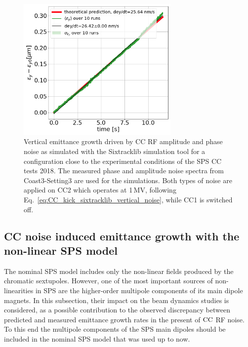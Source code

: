 \begin{figure}[!h]
    \centering         
    \includegraphics[width=0.7\textwidth]{images/Ch6/study_4_AN_PN_sxitracklib.png}
        \caption{Vertical emittance growth driven by CC RF amplitude and phase noise as simulated with the Sixtracklib simulation tool for a configuration close to the experimental conditions of the SPS CC tests 2018. The measured phase and amplitude noise spectra from Coast3-Setting3 are used for the simulations. Both types of noise are applied on CC2 which operates at 1\,MV, following Eq.~\eqref{eq:CC_kick_sixtracklib_vertical_noise}, while CC1 is switched off.}
        \label{fig:study_4_sixtracklib_global_cc_scheme_measured_spectra_AN_and_PN}
\end{figure}


\subsection{CC noise induced emittance growth with the non-linear SPS model}\label{subsec:global_CC_sixtracklib_noiseCoast3_setting3_non_linear_sps}


The nominal SPS model includes only the non-linear fields produced by the chromatic sextupoles. However, one of the most important sources of non-linearities in SPS are the higher-order multipole components of its main dipole magnets. In this subsection, their impact on the beam dynamics studies is considered, as a possible contribution to the observed discrepancy between predicted and measured emittance growth rates in the present of ${\mathrm{CC}}$ RF noise. To this end the multipole components of the SPS main dipoles should be included in the nominal SPS model that was used up to now.

